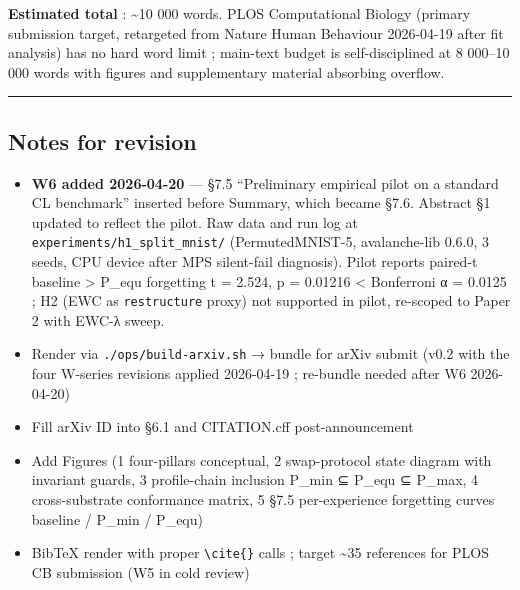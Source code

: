 \documentclass[
]{article}
\providecommand{\tightlist}{%
  \setlength{\itemsep}{0pt}\setlength{\parskip}{0pt}}
\begin{document}
\textbf{Estimated total} : \textasciitilde10 000 words. PLOS
Computational Biology (primary submission target, retargeted from Nature
Human Behaviour 2026-04-19 after fit analysis) has no hard word limit ;
main-text budget is self-disciplined at 8 000--10 000 words with figures
and supplementary material absorbing overflow.

\begin{center}\rule{0.5\linewidth}{0.5pt}\end{center}

\subsection{Notes for revision}\label{notes-for-revision}

\begin{itemize}
\tightlist
\item
  \textbf{W6 added 2026-04-20} --- §7.5 ``Preliminary empirical pilot on
  a standard CL benchmark'' inserted before Summary, which became §7.6.
  Abstract §1 updated to reflect the pilot. Raw data and run log at
  \texttt{experiments/h1\_split\_mnist/} (PermutedMNIST-5, avalanche-lib
  0.6.0, 3 seeds, CPU device after MPS silent-fail diagnosis). Pilot
  reports paired-t baseline \textgreater{} P\_equ forgetting t = 2.524,
  p = 0.01216 \textless{} Bonferroni α = 0.0125 ; H2 (EWC as
  \texttt{restructure} proxy) not supported in pilot, re-scoped to Paper
  2 with EWC-λ sweep.
\item
  Render via \texttt{./ops/build-arxiv.sh} → bundle for arXiv submit
  (v0.2 with the four W-series revisions applied 2026-04-19 ; re-bundle
  needed after W6 2026-04-20)
\item
  Fill arXiv ID into §6.1 and CITATION.cff post-announcement
\item
  Add Figures (1 four-pillars conceptual, 2 swap-protocol state diagram
  with invariant guards, 3 profile-chain inclusion P\_min ⊆ P\_equ ⊆
  P\_max, 4 cross-substrate conformance matrix, 5 §7.5 per-experience
  forgetting curves baseline / P\_min / P\_equ)
\item
  BibTeX render with proper \texttt{\textbackslash{}cite\{\}} calls ;
  target \textasciitilde35 references for PLOS CB submission (W5 in cold
  review)
\end{itemize}
\end{document}
